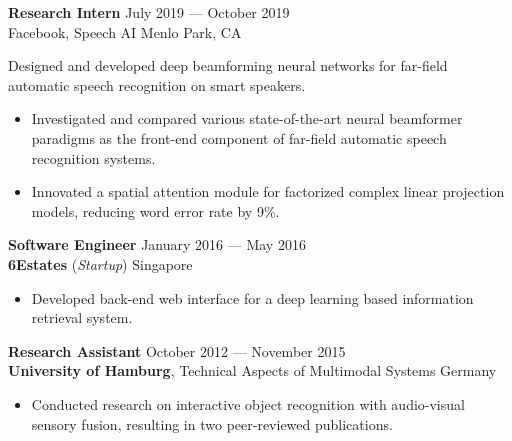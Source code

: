 \documentclass[a4paper,9pt]{extarticle} %
\begin{document}

\textbf{Research Intern} \hfill July 2019 --- October 2019 \\
Facebook, Speech AI  \hfill Menlo Park, CA \\
\vspace{-1.5\parskip}

Designed and developed deep beamforming neural networks for far-field automatic speech recognition on smart speakers.
\vspace{-0.9\parskip}
\begin{itemize}[nosep]
  \item Investigated and compared various state-of-the-art neural beamformer paradigms as the front-end component of far-field automatic speech recognition systems.
  \item Innovated a spatial attention module for factorized complex linear projection models, reducing word error rate by 9\%.
\end{itemize}


\iffalse{}

\textbf{Software Engineer} \hfill January 2016 --- May 2016 \\
\textbf{6Estates} (\textit{Startup})  \hfill Singapore \\
\vspace{-1.5\parskip}

\begin{itemize}[nosep]
  \item Developed back-end web interface for a deep learning based information retrieval system.
\end{itemize}


\textbf{Research Assistant} \hfill October 2012 --- November 2015 \\
\textbf{University of Hamburg}, Technical Aspects of Multimodal Systems \hfill Germany \\
\vspace{-1.5\parskip}

\begin{itemize}[nosep]
  \item Conducted research on interactive object recognition with audio-visual sensory fusion, resulting in two peer-reviewed publications.
\end{itemize}
\end{document}
